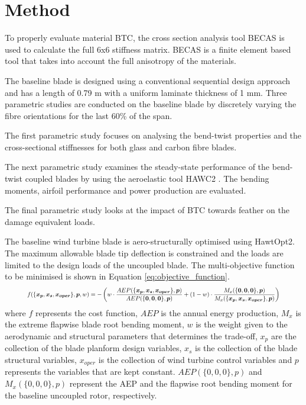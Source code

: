 \documentclass[a4paper]{jpconf}
\begin{document}

\section{Method}
\label{sec:method}
To properly evaluate material BTC, the cross section analysis tool BECAS \cite{becas1} is used to calculate the full 6x6 stiffness matrix. BECAS is a finite element based tool that takes into account the full anisotropy of the materials. 

The baseline blade is designed using a conventional sequential design approach and has a length of 0.79 m with a uniform laminate thickness of 1 mm. Three parametric studies are conducted on the baseline blade by discretely varying the fibre orientations for the last 60\% of the span.

The first parametric study focuses on analysing the bend-twist properties and the cross-sectional stiffnesses for both glass and carbon fibre blades.

The next parametric study examines the steady-state performance of the bend-twist coupled blades by using the aeroelastic tool HAWC2 \cite{hawc2}. The bending moments, airfoil performance and power production are evaluated.

The final parametric study looks at the impact of BTC towards feather on the damage equivalent loads.

The baseline wind turbine blade is aero-structurally optimised using HawtOpt2. The maximum allowable blade tip deflection is constrained and the loads are limited to the design loads of the uncoupled blade. The multi-objective function to be minimised is shown in Equation \ref{eq:objective_function}.
\begin{equation}
\resizebox{.9 \textwidth}{!}{ 
     $ f(\{\bm{x_p}, \bm{x_s}, \bm{x_{oper}}\},\bm{p}, w)= -\left( w \cdot \dfrac{AEP(\{\bm{x_p}, \bm{x_s}, \bm{x_{oper}}\},\bm{p})}{AEP(\{\bm{0},\bm{0},\bm{0}\},\bm{p})} + (1-w) \cdot \dfrac{M_x(\{\bm{0},\bm{0},\bm{0}\},\bm{p})}{M_x(\{\bm{x_p}, \bm{x_s}, \bm{x_{oper}}\},\bm{p})} \right)$
     }
\label{eq:objective_function}
\end{equation}
where $f$ represents the cost function, $AEP$ is the annual energy production, $M_x$ is the extreme flapwise blade root bending moment, $w$ is the weight given to the aerodynamic and structural parameters that determines the trade-off, $x_p$ are the collection of the blade planform design variables, $x_s$ is the collection of the blade structural variables, $x_{oper}$ is the collection of wind turbine control variables and $p$ represents the variables that are kept constant. $AEP(\{0,0,0\},p)$ and $M_x(\{0,0,0\},p)$ represent the AEP and the flapwise root bending moment for the baseline uncoupled rotor, respectively.
\end{document}
